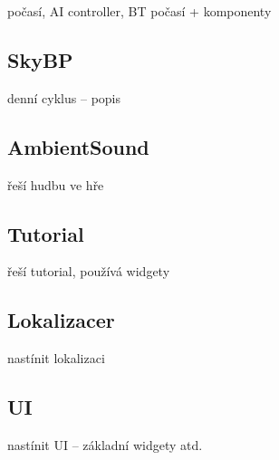 počasí, AI controller, BT počasí + komponenty

\subsection{SkyBP}

denní cyklus -- popis

\subsection{AmbientSound}

řeší hudbu ve hře

\subsection{Tutorial}

řeší tutorial, používá widgety


\subsection{Lokalizacer}

nastínit lokalizaci



\subsection{UI}
nastínit UI -- základní widgety atd.



